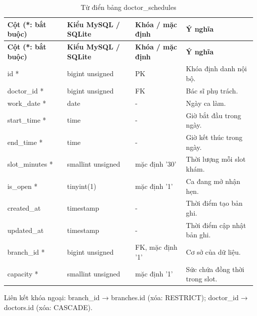 {\fontsize{10}{12}\selectfont\setlength{\tabcolsep}{3pt}\renewcommand{\arraystretch}{1.12}
\begin{longtable}{@{}L{\textwidth-4.86pt\relax} L{\textwidth-3.96pt\relax} L{\textwidth-2.88pt\relax} L{\textwidth-6.3pt\relax}@{}}
\caption{Từ điển bảng doctor\_\allowbreak{}schedules}\\
\toprule
\textbf{Cột (*:\allowbreak{} bắt buộc)} & \textbf{Kiểu My\allowbreak{}SQL /\allowbreak{} SQLite} & \textbf{Khóa /\allowbreak{} mặc định} & \textbf{Ý nghĩa}\\\midrule
\endfirsthead
\toprule
\textbf{Cột (*:\allowbreak{} bắt buộc)} & \textbf{Kiểu My\allowbreak{}SQL /\allowbreak{} SQLite} & \textbf{Khóa /\allowbreak{} mặc định} & \textbf{Ý nghĩa}\\\midrule
\endhead
\bottomrule\endlastfoot
id * & bigint unsigned & PK & Khóa định danh nội bộ.\allowbreak{}\\[1pt]
doctor\_\allowbreak{}id * & bigint unsigned & FK & Bác sĩ phụ trách.\allowbreak{}\\[1pt]
work\_\allowbreak{}date * & date & - & Ngày ca làm.\allowbreak{}\\[1pt]
start\_\allowbreak{}time * & time & - & Giờ bắt đầu trong ngày.\allowbreak{}\\[1pt]
end\_\allowbreak{}time * & time & - & Giờ kết thúc trong ngày.\allowbreak{}\\[1pt]
slot\_\allowbreak{}minutes * & smallint unsigned & mặc định '30' & Thời lượng mỗi slot khám.\allowbreak{}\\[1pt]
is\_\allowbreak{}open * & tinyint(1) & mặc định '1' & Ca đang mở nhận hẹn.\allowbreak{}\\[1pt]
created\_\allowbreak{}at & timestamp & - & Thời điểm tạo bản ghi.\allowbreak{}\\[1pt]
updated\_\allowbreak{}at & timestamp & - & Thời điểm cập nhật bản ghi.\allowbreak{}\\[1pt]
branch\_\allowbreak{}id * & bigint unsigned & FK, mặc định '1' & Cơ sở của dữ liệu.\allowbreak{}\\[1pt]
capacity * & smallint unsigned & mặc định '1' & Sức chứa đồng thời trong slot.\allowbreak{}\\[1pt]
\end{longtable}}
Liên kết khóa ngoại:\allowbreak{} branch\_\allowbreak{}id → branches.\allowbreak{}id (xóa:\allowbreak{} RESTRICT); doctor\_\allowbreak{}id → doctors.\allowbreak{}id (xóa:\allowbreak{} CASCADE).\allowbreak{}

